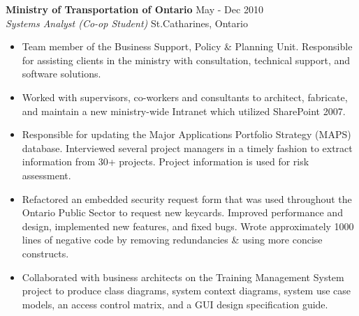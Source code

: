 \documentclass[margin]{res}
\begin{document}
\begin{resume}
	\textbf{Ministry of Transportation of Ontario} \hfill May - Dec 2010 \\
    {\sl Systems Analyst (Co-op Student)} \hfill St.\hspace{2 pt}Catharines, Ontario %
	\begin{itemize}  \itemsep -2pt %
	  \item Team member of the Business Support, Policy \& Planning Unit.
	  Responsible for assisting clients in the ministry with consultation, technical support,
	  and software solutions.
	  \item Worked with supervisors, co-workers and consultants to architect, fabricate,
	  and maintain a new ministry-wide Intranet which utilized SharePoint 2007.
	  \item Responsible for updating the Major Applications Portfolio Strategy (MAPS) database.
	  Interviewed several project managers in a timely fashion to extract information from 30+
	  projects. Project information is used for risk assessment.
	  \item Refactored an embedded security request form that was used throughout the
	  Ontario Public Sector to request new keycards. Improved performance and design,
	  implemented new features, and fixed bugs. Wrote approximately 1000 lines of negative code
	  by removing redundancies \& using more concise constructs.
	  \item Collaborated with business architects on the Training Management System project
	  to produce class diagrams, system context diagrams, system use case models,
	  an access control matrix, and a GUI design specification guide.
	\end{itemize}

%



\end{resume}
\end{document}
